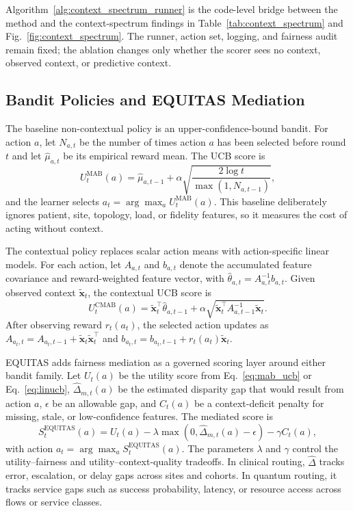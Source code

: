 \documentclass[conference]{IEEEtran}
\begin{document}
Algorithm~\ref{alg:context_spectrum_runner} is the code-level bridge between
the method and the context-spectrum findings in Table~\ref{tab:context_spectrum}
and Fig.~\ref{fig:context_spectrum}. The runner, action set, logging, and
fairness audit remain fixed; the ablation changes only whether the scorer sees
no context, observed context, or predictive context.

\subsection{Bandit Policies and EQUITAS Mediation}
The baseline non-contextual policy is an upper-confidence-bound bandit. For
action $a$, let $N_{a,t}$ be the number of times action $a$ has been selected
before round $t$ and let $\hat{\mu}_{a,t}$ be its empirical reward mean. The
UCB score is
\begin{equation}
U^{\mathrm{MAB}}_{t}(a) =
\hat{\mu}_{a,t-1} +
\alpha \sqrt{\frac{2\log t}{\max(1,N_{a,t-1})}},
\label{eq:mab_ucb}
\end{equation}
and the learner selects $a_t=\arg\max_a U^{\mathrm{MAB}}_{t}(a)$. This
baseline deliberately ignores patient, site, topology, load, or fidelity
features, so it measures the cost of acting without context.

The contextual policy replaces scalar action means with action-specific linear
models. For each action, let $A_{a,t}$ and $b_{a,t}$ denote the accumulated
feature covariance and reward-weighted feature vector, with
$\hat{\theta}_{a,t}=A_{a,t}^{-1}b_{a,t}$. Given observed context
$\tilde{\mathbf{x}}_t$, the contextual UCB score is
\begin{equation}
U^{\mathrm{CMAB}}_{t}(a) =
\tilde{\mathbf{x}}_t^\top\hat{\theta}_{a,t-1} +
\alpha
\sqrt{\tilde{\mathbf{x}}_t^\top A_{a,t-1}^{-1}\tilde{\mathbf{x}}_t}.
\label{eq:linucb}
\end{equation}
After observing reward $r_t(a_t)$, the selected action updates as
$A_{a_t,t}=A_{a_t,t-1}+\tilde{\mathbf{x}}_t\tilde{\mathbf{x}}_t^\top$ and
$b_{a_t,t}=b_{a_t,t-1}+r_t(a_t)\tilde{\mathbf{x}}_t$.

EQUITAS adds fairness mediation as a governed scoring layer around either
bandit family. Let $U_t(a)$ be the utility score from
Eq.~\ref{eq:mab_ucb} or Eq.~\ref{eq:linucb}, $\widehat{\Delta}_{m,t}(a)$ be
the estimated disparity gap that would result from action $a$, $\epsilon$ be
an allowable gap, and $C_t(a)$ be a context-deficit penalty for missing,
stale, or low-confidence features. The mediated score is
\begin{equation}
S^{\mathrm{EQUITAS}}_t(a) =
U_t(a) -
\lambda \max \left(0,\widehat{\Delta}_{m,t}(a)-\epsilon\right) -
\gamma C_t(a),
\label{eq:equitas_score}
\end{equation}
with action $a_t=\arg\max_a S^{\mathrm{EQUITAS}}_t(a)$. The parameters
$\lambda$ and $\gamma$ control the utility--fairness and
utility--context-quality tradeoffs. In clinical routing, $\widehat{\Delta}$
tracks error, escalation, or delay gaps across sites and cohorts. In quantum
routing, it tracks service gaps such as success probability, latency, or
resource access across flows or service classes.
\end{document}
